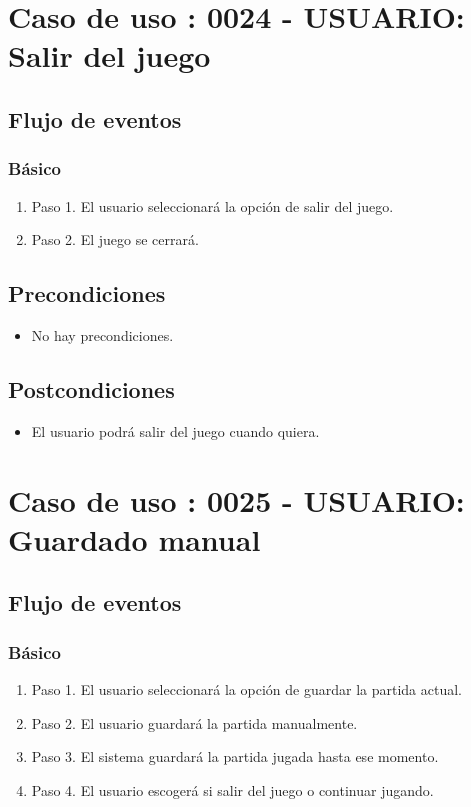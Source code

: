 \section{Caso de uso : 0024 - USUARIO: Salir del juego}\label{sec:uc0}
\subsection{Flujo de eventos}
\subsubsection{Básico}

\begin{enumerate}
\item Paso 1.
El usuario seleccionará la opción de salir del juego. 
\item Paso 2.
El juego se cerrará.
\end{enumerate}

\subsection{Precondiciones}
\begin{itemize}
\item No hay precondiciones.
\end{itemize}

\subsection{Postcondiciones}
\begin{itemize}
\item El usuario podrá salir del juego cuando quiera. 
\end{itemize}



\section{Caso de uso : 0025 - USUARIO: Guardado manual}\label{sec:uc0}
\subsection{Flujo de eventos}
\subsubsection{Básico}

\begin{enumerate}
\item Paso 1.
El usuario seleccionará la opción de guardar la partida actual.
\item Paso 2.
El usuario guardará la partida manualmente.  
\item Paso 3.
El sistema guardará la partida jugada hasta ese momento. 
\item Paso 4.
El usuario escogerá si salir del juego o continuar jugando. 
\end{enumerate}

